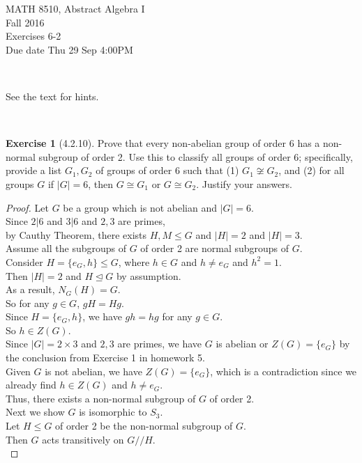 \documentclass{amsart}
\theoremstyle{plain}
\theoremstyle{definition}
\newtheorem{exer}[lem]{Exercise}
\begin{document}
\noindent MATH 8510, Abstract Algebra I \\
Fall 2016\\
Exercises 6-2\\
Due date Thu 29 Sep 4:00PM

\

\noindent
See the text for hints.

\

%
%

\begin{exer}[4.2.10]
Prove that every non-abelian group of order 6 has a non-normal subgroup of order 2.
Use this to classify all groups of order 6;
specifically, provide a list $G_1,G_2$ of groups of order 6 such that (1) $G_1\not\cong G_2$, and (2) for all groups $G$ if $|G|=6$, then $G\cong G_1$ or $G\cong G_2$.
Justify your answers.
\begin{proof}
Let $G$ be a group which is not abelian and $|G| = 6$.\\
Since $2 | 6$ and $3 | 6$ and $2,3$ are primes, \\
by Cauthy Theorem, there exists $H, M \leq G$ and $|H| = 2$ and $|H| = 3$.\\
Assume all the subgroups of $G$ of order 2 are normal subgroups of $G$. \\
Consider $H=\{e_G,h\} \leq G$, where $h \in G$ and $h \neq e_G$ and $h^2 = 1$. \\
Then $|H| = 2$ and $H \unlhd G$ by assumption. \\
As a result, $N_G(H) = G$.\\
So for any $g \in G$, $gH = Hg$.\\
Since $H = \{e_G,h\}$, we have $gh = hg$ for any $g \in G$.\\
So $h \in Z(G)$.\\
Since $|G| = 2\times 3$ and $2,3$ are primes, we have $G$ is abelian or $Z(G)= \{e_G\}$ by the conclusion from Exercise 1 in homework 5.\\
Given $G$ is not abelian, we have $Z(G) = \{e_G\}$, which is a contradiction since we already find $h \in Z(G)$ and $h \neq e_G$.\\
Thus, there exists a non-normal subgroup of $G$ of order 2.\\
Next we show $G$ is isomorphic to $S_3$.\\
Let $H \leq G$ of order 2 be the non-normal subgroup of $G$.\\
Then $G$ acts transitively on $G//H$. \\

\end{proof}
\end{exer}
\end{document}
